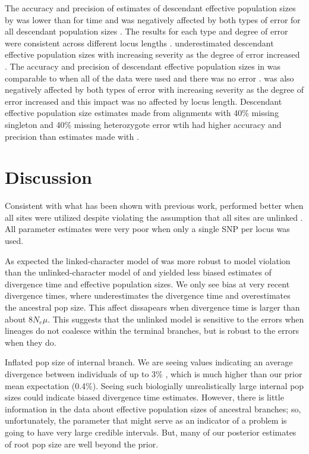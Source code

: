 The accuracy and precision of estimates of descendant effective population sizes 
by \beast was lower than for time and was negatively affected by both types
of error for all descendant population sizes \thetafigsp.
The results for each type and degree of error were consistent across different 
locus lengths \thetafigsp.
\beast underestimated descendant effective population sizes with increasing severity 
as the degree of error increased \thetafigsp.
The accuracy and precision of descendant effective population sizes in 
\ecoevolity was comparable to \beast when all of 
the data were used and there was no error \thetafigsp. 
\ecoevolity was also negatively affected
by both types of error with increasing severity as the degree of error increased
and this impact was no affected by locus length.
Descendant effective population size estimates made from alignments with 40\%
missing singleton and 40\% missing heterozygote error wtih \beast had higher
accuracy and precision than estimates made with \ecoevolity \thetafigsp.   

\section{Discussion}

Consistent with what has been shown with previous work, \ecoevolity performed 
better when all sites were utilized despite violating the assumption that all 
sites are unlinked \citep{Oaks2018ecoevolity}. All parameter estimates were very
poor when only a single SNP per locus was used. 

As expected the linked-character model of \ecoevolity was more robust to model 
violation than the unlinked-character model of \starbeast and yielded less biased 
estimates of divergence time and effective population sizes. 
We only see bias at very recent divergence times, where \ecoevolity
underestimates the divergence time and overestimates the ancestral pop size.
This affect dissapears when divergence time is larger than about $8N_e\mu$.
This suggests that the unlinked model is sensitive to the errors
when lineages do not coalesce within the terminal branches,
but is robust to the errors when they do.

Inflated pop size of internal branch.
We are seeing values indicating an average divergence between individuals of up
to 3\% \rootfigs, which is much higher than our prior mean expectation (0.4\%).
Seeing such biologially unrealistically large internal pop sizes could indicate
biased divergence time estimates.
However, there is little information in the data about effective population sizes 
of ancestral branches; so, unfortunately, the parameter that might serve as an indicator
of a problem is going to have very large credible intervals.
But, many of our posterior estimates of root pop size are well beyond the
prior.

